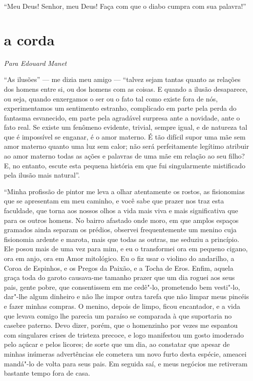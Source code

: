 “Meu Deus! Senhor, meu Deus! Faça com que o diabo cumpra
com sua palavra!''

\quebra\section[A corda]{a corda}
\begin{flushright}
\textit{Para Edouard Manet}
\end{flushright}

“As ilusões'' --- me dizia meu amigo --- “talvez sejam
tantas quanto as relações dos homens entre si, ou dos homens com as
coisas. E quando a ilusão desaparece, ou seja, quando enxergamos o ser
ou o fato tal como existe fora de nós, experimentamos um sentimento
estranho, complicado em parte pela perda do fantasma esvanecido, em
parte pela agradável surpresa ante a novidade, ante o fato real.
Se existe um fenômeno evidente, trivial, sempre igual, e de natureza
tal que é impossível se enganar, é o amor materno. É tão difícil supor
uma mãe sem amor materno quanto uma luz sem calor; não será
perfeitamente legítimo atribuir ao amor materno todas as ações e
palavras de uma mãe em relação ao seu filho? E, no entanto, escute esta
pequena história em que fui singularmente mistificado pela ilusão mais
natural''.

“Minha profissão de pintor me leva a olhar atentamente os
rostos, as fisionomias que se apresentam em meu caminho, e você sabe que
prazer nos traz esta faculdade, que torna aos nossos olhos a vida mais
viva e mais significativa que para os outros homens. No bairro afastado
onde moro, em que amplos espaços gramados ainda separam os prédios,
observei frequentemente um menino cuja fisionomia ardente e marota,
mais que todas as outras, me seduziu a princípio. Ele posou mais de
uma vez para mim, e eu o transformei ora em pequeno cigano, ora em
anjo, ora em Amor mitológico. Eu o fiz usar o violino do andarilho, a
Coroa de Espinhos, e os Pregos da Paixão, e a Tocha de Eros. Enfim,
aquela graça toda do garoto causava-me tamanho prazer que 
um dia roguei aos seus pais, gente pobre, que consentissem em me cedê"-lo,
prometendo bem vesti"-lo, dar"-lhe algum dinheiro e não lhe impor 
outra tarefa que não limpar meus pincéis e fazer minhas compras. O
menino, depois de limpo, ficou encantador, e a vida que levava
comigo lhe parecia um paraíso se comparada à que suportaria no casebre
paterno. Devo dizer, porém, que o homenzinho por vezes me espantou com
singulares crises de tristeza precoce, e logo manifestou um gosto
imoderado pelo açúcar e pelos licores; de sorte que um dia, ao constatar que apesar de minhas inúmeras advertências ele cometera
um novo furto desta espécie, ameacei mandá"-lo de volta para seus pais.
Em seguida saí, e meus negócios me retiveram bastante tempo fora de
casa.

